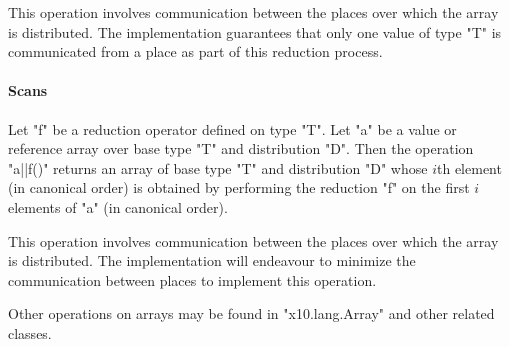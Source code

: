 This operation involves communication between the places over which
the array is distributed. The \Xten{} implementation guarantees that
only one value of type \xcd"T" is communicated from a place as part of
this reduction process.

\paragraph{Scans}\label{ArrayScans}

Let \xcd"f" be a reduction operator defined on type \xcd"T". Let
\xcd"a" be a value or reference array over base type \xcd"T" and
distribution \xcd"D". Then the operation \xcd"a||f()" returns an array
of base type \xcd"T" and distribution \xcd"D" whose $i$th element
(in canonical order) is obtained by performing the reduction \xcd"f"
on the first $i$ elements of \xcd"a" (in canonical order).

This operation involves communication between the places over which
the array is distributed. The \Xten{} implementation will endeavour to
minimize the communication between places to implement this operation.

Other operations on arrays may be found in \xcd"x10.lang.Array" and
other related classes.
